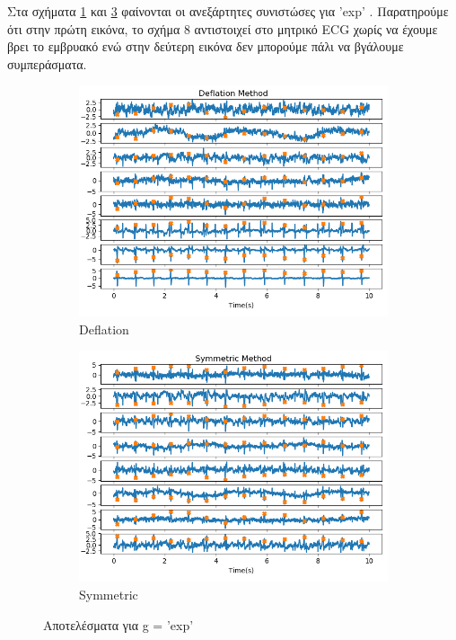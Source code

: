 \noindent Στα σχήματα \ref{fig:5.30a} και \ref{fig:5.30b} φαίνονται οι ανεξάρτητες συνιστώσες για \en 'exp' \gr. Παρατηρούμε ότι στην πρώτη εικόνα, το σχήμα 8 αντιστοιχεί στο μητρικό \en ECG \gr χωρίς να έχουμε βρει το εμβρυακό ενώ στην δεύτερη εικόνα δεν μπορούμε πάλι να βγάλουμε συμπεράσματα. 
\begin{figure}[H]
    \centering
    \begin{subfigure}{0.48 \textwidth}
        \centering
       \includegraphics[width=\textwidth]{daisy/exp_def.png} \en
        \caption{Deflation} \gr
        \label{fig:5.30a}
    \end{subfigure}
    \hfill
    \begin{subfigure}{0.48 \textwidth}
        \centering
       \includegraphics[width=\textwidth]{daisy/exp_sym.png} \en
        \en
        \caption{Symmetric} \gr
        \label{fig:5.30b}
    \end{subfigure}
    \gr
    \caption{Αποτελέσματα για \en g = 'exp' \gr}
\end{figure}
